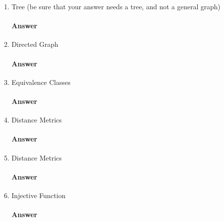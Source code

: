 \documentclass{article}
\begin{document}
\begin{enumerate}

    \item Tree (be sure that your answer needs a tree, and not a general graph)

        \paragraph{Answer}


    \item Directed Graph

        \paragraph{Answer}


    \item Equivalence Classes

        \paragraph{Answer}


    \item Distance Metrics

        \paragraph{Answer}


    \item Distance Metrics

        \paragraph{Answer}


    \item Injective Function

        \paragraph{Answer}



\end{enumerate}
\end{document}
